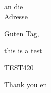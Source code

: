 \documentclass[11pt,twoside]{article}
\begin{document}
\begin{letter}{
an die \\
Adresse\\
}

\opening{Guten Tag,}

this is a test

TEST420\cite{gdpr}


\closing{Thank you en}


\end{letter}
\end{document}
